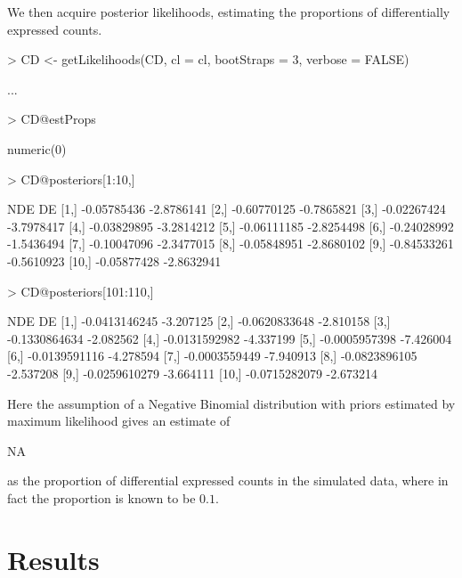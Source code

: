 \documentclass[a4paper]{article}
\begin{document}
We then acquire posterior likelihoods, estimating the proportions of differentially expressed counts.

\begin{Schunk}
\begin{Sinput}
> CD <- getLikelihoods(CD, cl = cl, bootStraps = 3, verbose = FALSE)
\end{Sinput}
\begin{Soutput}
...
\end{Soutput}
\begin{Sinput}
> CD@estProps
\end{Sinput}
\begin{Soutput}
numeric(0)
\end{Soutput}
\begin{Sinput}
> CD@posteriors[1:10,]
\end{Sinput}
\begin{Soutput}
              NDE         DE
 [1,] -0.05785436 -2.8786141
 [2,] -0.60770125 -0.7865821
 [3,] -0.02267424 -3.7978417
 [4,] -0.03829895 -3.2814212
 [5,] -0.06111185 -2.8254498
 [6,] -0.24028992 -1.5436494
 [7,] -0.10047096 -2.3477015
 [8,] -0.05848951 -2.8680102
 [9,] -0.84533261 -0.5610923
[10,] -0.05877428 -2.8632941
\end{Soutput}
\begin{Sinput}
> CD@posteriors[101:110,]
\end{Sinput}
\begin{Soutput}
                NDE        DE
 [1,] -0.0413146245 -3.207125
 [2,] -0.0620833648 -2.810158
 [3,] -0.1330864634 -2.082562
 [4,] -0.0131592982 -4.337199
 [5,] -0.0005957398 -7.426004
 [6,] -0.0139591116 -4.278594
 [7,] -0.0003559449 -7.940913
 [8,] -0.0823896105 -2.537208
 [9,] -0.0259610279 -3.664111
[10,] -0.0715282079 -2.673214
\end{Soutput}
\end{Schunk}

Here the assumption of a Negative Binomial distribution with priors estimated by maximum likelihood gives an estimate of 
\begin{Schunk}
\begin{Soutput}
[1] NA
\end{Soutput}
\end{Schunk}
as the proportion of differential expressed counts in the simulated data, where in fact the proportion is known to be $0.1$.

\section{Results}
\end{document}
